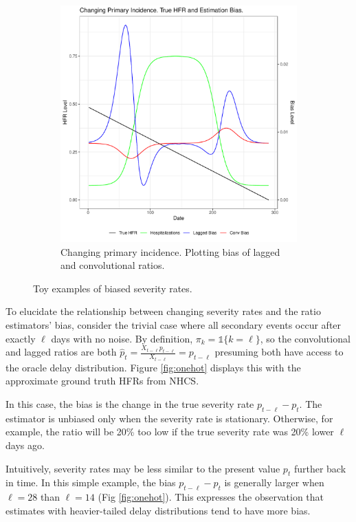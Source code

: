 \documentclass{article}
\begin{document}
\begin{figure}
\begin{subfigure}[b]{0.45\linewidth}
         \includegraphics[width=\linewidth]{Figs/Simulated/sim_chging_primary.pdf}
         \caption{Changing primary incidence. Plotting bias of lagged and convolutional ratios.}
         \label{fig:chging_primary}
     \end{subfigure}
        \caption{Toy examples of biased severity rates.}
        \label{fig:bias_ex}
\end{figure}


To elucidate the relationship between changing severity rates and the ratio estimators' bias, consider the trivial case where all secondary events occur after exactly $\ell$ days with no noise. By definition, $\pi_k = \mathds{1}\{k=\ell\}$, so the convolutional and lagged ratios are both $\hat{p}_t = \frac{X_{t-\ell}p_{t-\ell}}{X_{t-\ell}} = p_{t-\ell}$ presuming both have access to the oracle delay distribution. Figure \ref{fig:onehot} displays this with the approximate ground truth HFRs from NHCS. 

In this case, the bias is the change in the true severity rate $p_{t-\ell} - p_t$. The estimator is unbiased only when the severity rate is stationary. Otherwise, for example, the ratio will be 20\% too low if the true severity rate was 20\% lower $\ell$ days ago. 

Intuitively, severity rates may be less similar to the present value $p_t$ further back in time. In this simple example, the bias $p_{t-\ell}-p_t$ is generally larger when $\ell=28$ than $\ell=14$ (Fig \ref{fig:onehot}). This expresses the observation that estimates with heavier-tailed delay distributions tend to have more bias. 
\end{document}
